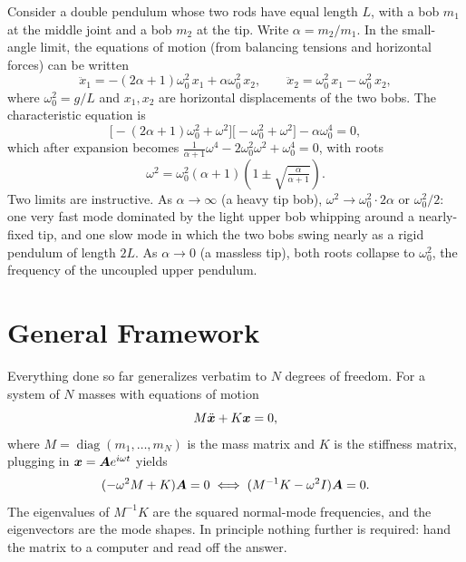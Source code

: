 \begin{example}
Consider a double pendulum whose two rods have equal length $L$, with a bob $m_1$ at the middle joint and a bob $m_2$ at the tip. Write $\alpha = m_2/m_1$. In the small-angle limit, the equations of motion (from balancing tensions and horizontal forces) can be written
\begin{equation}
    \ddot{x}_1 = -(2\alpha+1)\omega_0^2\, x_1 + \alpha \omega_0^2\, x_2, \qquad
    \ddot{x}_2 = \omega_0^2\, x_1 - \omega_0^2\, x_2,
\end{equation}
where $\omega_0^2 = g/L$ and $x_1, x_2$ are horizontal displacements of the two bobs. The characteristic equation is
\begin{equation}
    \bigl[-(2\alpha+1)\omega_0^2 + \omega^2\bigr]\bigl[-\omega_0^2 + \omega^2\bigr] - \alpha \omega_0^4 = 0,
\end{equation}
which after expansion becomes $\tfrac{1}{\alpha+1}\omega^4 - 2\omega_0^2 \omega^2 + \omega_0^4 = 0$, with roots
\begin{equation}
    \omega^2 = \omega_0^2 (\alpha + 1)\!\left(1 \pm \sqrt{\tfrac{\alpha}{\alpha+1}}\right).
\end{equation}
Two limits are instructive. As $\alpha \to \infty$ (a heavy tip bob), $\omega^2 \to \omega_0^2 \cdot 2\alpha$ or $\omega_0^2/2$: one very fast mode dominated by the light upper bob whipping around a nearly-fixed tip, and one slow mode in which the two bobs swing nearly as a rigid pendulum of length $2L$. As $\alpha \to 0$ (a massless tip), both roots collapse to $\omega_0^2$, the frequency of the uncoupled upper pendulum.
\end{example}

\section{General Framework}

Everything done so far generalizes verbatim to $N$ degrees of freedom. For a system of $N$ masses with equations of motion
\begin{equation}
    M \ddot{\bm{x}} + K \bm{x} = 0,
\end{equation}
where $M = \operatorname{diag}(m_1, \ldots, m_N)$ is the mass matrix and $K$ is the stiffness matrix, plugging in $\lvect{x} = \vect{A} e^{i\omega t}$ yields
\begin{equation}
    (-\omega^2 M + K)\vect{A} = 0 \;\Longleftrightarrow\; (M^{-1} K - \omega^2 I)\vect{A} = 0.
\end{equation}
The eigenvalues of $M^{-1} K$ are the squared normal-mode frequencies, and the eigenvectors are the mode shapes. In principle nothing further is required: hand the matrix to a computer and read off the answer.

